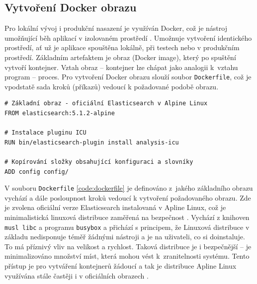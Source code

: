 \documentclass[FM,DP]{tulthesis}
\newenvironment{code}
    {\filbreak\captionsetup{type=listing}}{\filbreak}
\begin{document}
\subsection{Vytvoření Docker obrazu}

Pro lokální vývoj i produkční nasazení
je využíván Docker, což je nástroj umožňující běh aplikací v izolovaném prostředí
\cite{docker}. Umožnuje vytvoření identického prostředí, ať už je aplikace spouštěna 
lokálně, při testech nebo v produkčním prostředí. Základním artefaktem je obraz (Docker
image), který po spuštění vytvoří kontejner. Vztah obraz -- kontejner lze chápat jako 
analogii k~vztahu program -- proces. Pro vytvoření Docker obrazu slouží soubor \verb|Dockerfile|,
což je vpodstatě sada kroků (příkazů) vedoucí k požadované podobě obrazu.

\begin{code}
\captionsetup{singlelinecheck=false,justification=raggedright}
\label{code:dockerfile}
\begin{verbatim}
# Základní obraz - oficiální Elasticsearch v Alpine Linux
FROM elasticsearch:5.1.2-alpine

# Instalace pluginu ICU
RUN bin/elasticsearch-plugin install analysis-icu

# Kopírování složky obsahující konfiguraci a slovníky
ADD config config/
\end{verbatim}
\end{code}

V souboru \verb|Dockerfile| \ref{code:dockerfile} je definováno z~jakého
základního obrazu vychází a dále posloupnost kroků vedoucí k vytvoření požadovaného obrazu.
Zde je zvolena oficiální verze Elasticsearch instalovaná v Apline Linux, což je minimalistická 
linuxová distribuce zaměřená na bezpečnost \cite{alpine}. Vychází z knihoven \verb|musl libc| 
a programu \verb|busybox| a přichází s principem, že Linuxová distribuce v základu
nedisponuje téměř žádnými nástroji a je na uživateli, co si doinstaluje. To má příznivý
vliv na velikost a rychlost. Taková distribuce je i bezpečnější -- je minimalizováno 
množství míst, která mohou vést k~zranitelnosti systému. Tento přístup je pro vytváření
kontejnerů žádoucí a tak je distribuce Apline Linux využívána stále častěji
i v oficiálních obrazech \cite{alpine-lean}.
\end{document}
